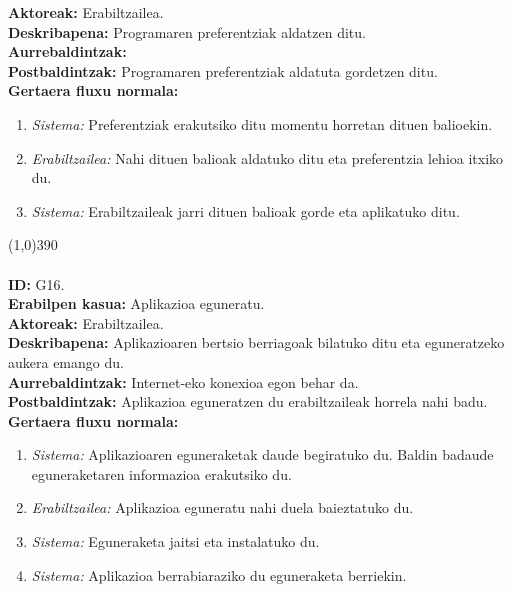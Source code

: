 \textbf{Aktoreak:} Erabiltzailea.\\
\textbf{Deskribapena:} Programaren preferentziak aldatzen ditu.\\
\textbf{Aurrebaldintzak:}\\
\textbf{Postbaldintzak:} Programaren preferentziak aldatuta gordetzen ditu.\\
\textbf{Gertaera fluxu normala:}
\begin{enumerate}
	\item \textit{Sistema:} Preferentziak erakutsiko ditu momentu horretan dituen balioekin.
	\item \textit{Erabiltzailea:} Nahi dituen balioak aldatuko ditu eta preferentzia lehioa itxiko du.
	\item \textit{Sistema:} Erabiltzaileak jarri dituen balioak gorde eta aplikatuko ditu.
\end{enumerate}
\line(1,0){390}\\
\noindent\\
\textbf{ID:} G16.\\
\textbf{Erabilpen kasua:} Aplikazioa eguneratu.\\
\textbf{Aktoreak:} Erabiltzailea.\\
\textbf{Deskribapena:} Aplikazioaren bertsio berriagoak bilatuko ditu eta eguneratzeko aukera emango du.\\
\textbf{Aurrebaldintzak:} Internet-eko konexioa egon behar da.\\
\textbf{Postbaldintzak:} Aplikazioa eguneratzen du erabiltzaileak horrela nahi badu.\\
\textbf{Gertaera fluxu normala:}
\begin{enumerate}
	\item \textit{Sistema:} Aplikazioaren eguneraketak daude begiratuko du. Baldin badaude eguneraketaren informazioa erakutsiko du.
	\item \textit{Erabiltzailea:} Aplikazioa eguneratu nahi duela baieztatuko du.
	\item \textit{Sistema:} Eguneraketa jaitsi eta instalatuko du.
	\item \textit{Sistema:} Aplikazioa berrabiaraziko du eguneraketa berriekin.
\end{enumerate}
\newpage
